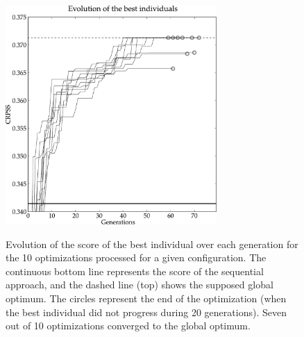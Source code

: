 \documentclass{ametsoc}
\begin{document}
\begin{figure}[t]
	\begin{center}
		\noindent\includegraphics[width=19pc,angle=0]{fig05.pdf}\\
	\end{center}
	\caption{Evolution of the score of the best individual over each generation for the 10 optimizations processed for a given configuration. The continuous bottom line represents the score of the sequential approach, and the dashed line (top) shows the supposed global optimum. The circles represent the end of the optimization (when the best individual did not progress during 20 generations). Seven out of 10 optimizations converged to the global optimum.}
	\label{fig:gas_evolution_good}
\end{figure}
\end{document}
